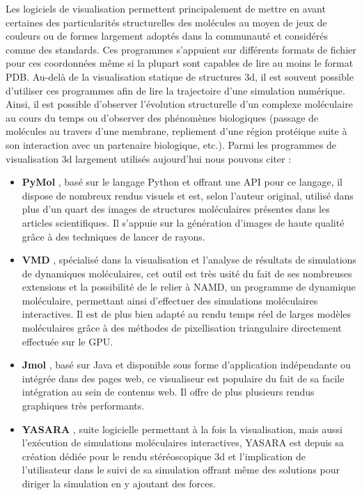 Les logiciels de visualisation permettent principalement de mettre en avant certaines des particularités structurelles des molécules au moyen de jeux de couleurs ou de formes largement adoptés dans la communauté et considérés comme des standards.
Ces programmes s'appuient sur différents formats de fichier pour ces coordonnées même si la plupart sont capables de lire au moins le format PDB. Au-delà de la visualisation statique de structures 3d, il est souvent possible d'utiliser ces programmes afin de lire la trajectoire d'une simulation numérique. Ainsi, il est possible d'observer l'évolution structurelle d'un complexe moléculaire au cours du temps ou d'observer des phénomènes biologiques (passage de molécules au travers d'une membrane, repliement d'une région protéique suite à son interaction avec un partenaire biologique, etc.). Parmi les programmes de visualisation 3d largement utilisés aujourd'hui nous pouvons citer : 
\begin{itemize}
  \item \textbf{PyMol} \cite{delano_pymol_2002}, basé sur le langage Python et offrant une API pour ce langage, il dispose de nombreux rendus visuels et est, selon l'auteur original, utilisé dans plus d'un quart des images de structures moléculaires présentes dans les articles scientifiques. Il s'appuie sur la génération d'images de haute qualité grâce à des techniques de lancer de rayons.
  \item \textbf{VMD} \cite{humphrey_vmd:_1996}, spécialisé dans la visualisation et l'analyse de résultats de simulations de dynamiques moléculaires, cet outil est très usité du fait de ses nombreuses extensions et la possibilité de le relier à NAMD, un programme de dynamique moléculaire, permettant ainsi d'effectuer des simulations moléculaires interactives. Il est de plus bien adapté au rendu temps réel de larges modèles moléculaires grâce à des méthodes de pixellisation triangulaire  directement effectuée sur le GPU.
  \item \textbf{Jmol} \cite{herraez2006biomolecules}, basé sur Java et disponible sous forme d'application indépendante ou intégrée dans des pages web, ce visualiseur est populaire du fait de sa facile intégration au sein de contenus web. Il offre de plus plusieurs rendus graphiques très performants.
  \item \textbf{YASARA} \cite{krieger2014yasara}, suite logicielle permettant à la fois la visualisation, mais aussi l’exécution de simulations moléculaires interactives, YASARA est depuis sa création dédiée pour le rendu stéréoscopique 3d et l'implication de l'utilisateur dans le suivi de sa simulation offrant même des solutions pour diriger la simulation en y ajoutant des forces.
\end{itemize}
